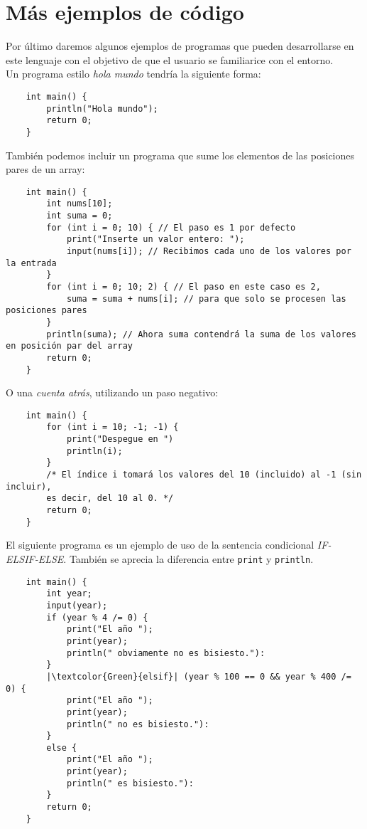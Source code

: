 \documentclass[10pt a4paper]{article}
\newcommand{\code}[1]{\colorbox{light-gray}{\texttt{#1}}}
\numberwithin{equation}{section}
\begin{document}
\section{Más ejemplos de código}
Por último daremos algunos ejemplos de programas que pueden desarrollarse en este lenguaje con el objetivo de que el usuario se familiarice con el entorno. \\
\newline
Un programa estilo \textit{hola mundo} tendría la siguiente forma:

\begin{verbatim}
    int main() {
        println("Hola mundo");
        return 0;
    }
\end{verbatim}

También podemos incluir un programa que sume los elementos de las posiciones pares de un array:

\begin{verbatim}
    int main() {
        int nums[10];
        int suma = 0;
        for (int i = 0; 10) { // El paso es 1 por defecto
            print("Inserte un valor entero: ");
            input(nums[i]); // Recibimos cada uno de los valores por la entrada
        }
        for (int i = 0; 10; 2) { // El paso en este caso es 2,
            suma = suma + nums[i]; // para que solo se procesen las posiciones pares
        }
        println(suma); // Ahora suma contendrá la suma de los valores en posición par del array
        return 0;
    }
\end{verbatim}

O una \textit{cuenta atrás}, utilizando un paso negativo:

\begin{verbatim}
    int main() {
        for (int i = 10; -1; -1) {
            print("Despegue en ")
            println(i);
        }
        /* El índice i tomará los valores del 10 (incluido) al -1 (sin incluir),
        es decir, del 10 al 0. */
        return 0;
    }    
\end{verbatim}

El siguiente programa es un ejemplo de uso de la sentencia condicional \textit{IF-ELSIF-ELSE}. También se aprecia la diferencia entre \code{print} y \code{println}.

\begin{verbatim}
    int main() {
        int year;
        input(year);
        if (year % 4 /= 0) {
            print("El año ");
            print(year);
            println(" obviamente no es bisiesto."):
        }
        |\textcolor{Green}{elsif}| (year % 100 == 0 && year % 400 /= 0) {
            print("El año ");
            print(year);
            println(" no es bisiesto."):
        }
        else {
            print("El año ");
            print(year);
            println(" es bisiesto."):
        }
        return 0;
    }
\end{verbatim}
\end{document}
